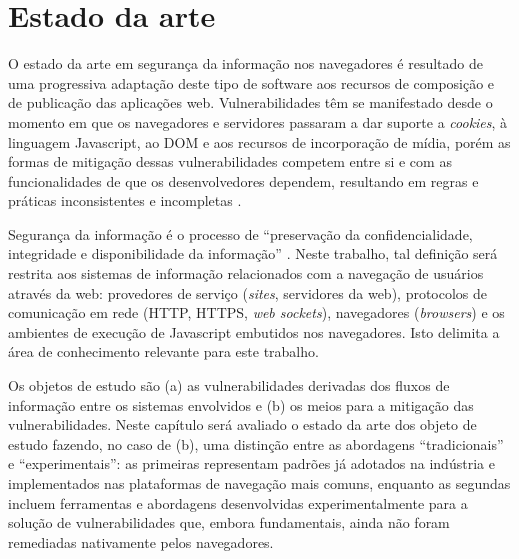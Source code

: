 

\section{Estado da arte}
O estado da arte em segurança da informação nos navegadores é resultado de uma progressiva adaptação deste tipo de software aos recursos de composição e de publicação das aplicações web. Vulnerabilidades têm se manifestado desde o momento em que os navegadores e servidores passaram a dar suporte a \textit{cookies}, à linguagem Javascript, ao DOM e aos recursos de incorporação de mídia, porém as formas de mitigação dessas vulnerabilidades competem entre si e com as funcionalidades de que os desenvolvedores dependem, resultando em regras e práticas inconsistentes e incompletas \cite{Hill2016}.

Segurança da informação é o processo de ``preservação da confidencialidade, integridade e disponibilidade da informação'' \cite{ISO2016}. Neste trabalho, tal definição será restrita aos sistemas de informação relacionados com a navegação de usuários através da web: provedores de serviço (\textit{sites}, servidores da web), protocolos de comunicação em rede (HTTP, HTTPS, \textit{web sockets}), navegadores (\textit{browsers}) e os ambientes de execução de Javascript embutidos nos navegadores. Isto delimita a área de conhecimento relevante para este trabalho.

Os objetos de estudo são (a) as vulnerabilidades derivadas dos fluxos de informação \cite{Goguen1982} \cite{Denning1976} entre os sistemas envolvidos e (b) os meios para a mitigação das vulnerabilidades. Neste capítulo será avaliado o estado da arte dos objeto de estudo fazendo, no caso de (b), uma distinção entre as abordagens ``tradicionais'' e ``experimentais'': as primeiras representam padrões já adotados na indústria e implementados nas plataformas de navegação mais comuns, enquanto as segundas incluem ferramentas e abordagens desenvolvidas experimentalmente para a solução de vulnerabilidades que, embora fundamentais, ainda não foram remediadas nativamente pelos navegadores.


